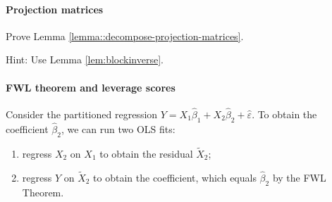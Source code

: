 %

 
 
 
 
\paragraph{Projection matrices}\label{hw08::decompose-projection-m}

 Prove Lemma \ref{lemma::decompose-projection-matrices}. 
 
 
 Hint: Use Lemma \ref{lem:blockinverse}. 



\paragraph{FWL theorem and leverage scores}\label{hw7::fwl-hat-matrix}

Consider the partitioned regression $Y = X_1 \hat{\beta}_1 + X_2 \hat{\beta}_2 + \hat{\varepsilon}$.
To obtain the coefficient $\hat{\beta}_2$, we can run two OLS fits: 
\begin{enumerate}
[(R1)]
\item\label{reg1-leverage}
regress $X_2$ on $X_1$ to obtain the residual $\tilde{X}_2$;
\item\label{reg2-leverage}
regress $Y$ on $\tilde{X}_2$ to obtain the coefficient, which equals $\hat{\beta}_2$ by the FWL Theorem. 
\end{enumerate}

